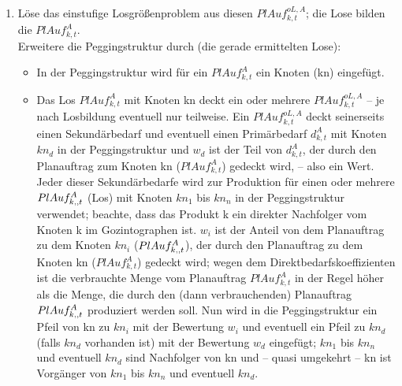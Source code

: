 \begin{algorithmic}
\begin{itemize} [leftmargin=*]
\begin{enumerate} [leftmargin=1.5em, label=]
\begin{enumerate} [leftmargin=*, label= \arabic*.]
                \item			
                Löse das einstufige Losgrößenproblem aus diesen $PlAuf^{oL,A}_{k,t}$; die Lose bilden die $PlAuf^{A}_{k,t}$. \\
                Erweitere die Peggingstruktur durch (die gerade ermittelten Lose): 
                \begin{itemize} [leftmargin=*]
                    \item
                    In der Peggingstruktur wird für ein $PlAuf^{A}_{k,t}$ ein Knoten (kn) eingefügt. \\
                    \item
                    Das Los $PlAuf^{A}_{k,t}$ mit Knoten kn deckt ein oder mehrere $PlAuf^{oL,A}_{k,t}$ -- je nach Losbildung eventuell nur teilweise. Ein $PlAuf^{oL,A}_{k,t}$ deckt seinerseits einen Sekundärbedarf und eventuell einen Primärbedarf $d^{A}_{k,t}$ mit Knoten $kn_d$ in der Peggingstruktur und $w_d$ ist der Teil von $d^{A}_{k,t}$, der durch den Planauftrag zum Knoten kn ($PlAuf^{A}_{k,t}$) gedeckt wird, -- also ein Wert. Jeder dieser Sekundärbedarfe wird zur Produktion für einen oder mehrere $PlAuf^{A}_{k\textsc{\char13},t}$ (Los) mit Knoten $kn_1$ bis $kn_n$ in der Peggingstruktur verwendet; beachte, dass das Produkt k\textsc{} ein direkter Nachfolger vom Knoten k im Gozintographen ist. $w_i$ ist der Anteil von dem Planauftrag zu dem Knoten $kn_i$ ($PlAuf^{A}_{k\textsc{\char13},t}$), der durch den Planauftrag zu dem Knoten kn ($PlAuf^{A}_{k,t}$) gedeckt wird; wegen dem Direktbedarfskoeffizienten ist die verbrauchte Menge vom Planauftrag $PlAuf^{A}_{k,t}$ in der Regel höher als die Menge, die durch den (dann verbrauchenden) Planauftrag $PlAuf^{A}_{k\textsc{\char13},t}$ produziert werden soll. Nun wird in die Peggingstruktur ein Pfeil von kn zu $kn_i$ mit der Bewertung $w_i$ und eventuell ein Pfeil zu $kn_d$ (falls $kn_d$ vorhanden ist) mit der Bewertung $w_d$ eingefügt; $kn_1$ bis $kn_n$ und eventuell $kn_d$ sind Nachfolger von kn und -- quasi umgekehrt -- kn ist Vorgänger von $kn_1$ bis $kn_n$ und eventuell $kn_d$.																												
                \end{itemize}
                
            \end{enumerate}	
            
        \end{enumerate}	
        
    \end{itemize}	
    

\end{algorithmic}
